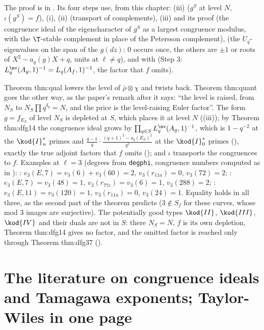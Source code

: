 The proof is in . Its four steps use, from this chapter: (iii) ($g^S$ at level $N$, $\iota(g^S)=f$),
(i), (ii) (transport of complements), (iii) and its proof (the congruence ideal of the eigencharacter of $g^S$ as a
largest congruence modulus, with the $\T$-stable complement in place of the Petersson complement),  (the $U_q$-eigenvalues on
the span of the $g(dz)$: $0$ occurs once, the others are $\pm1$ or roots of $X^2-a_q(g)X+q$, units at $\ell\ne q$), and  with
 (Step 3: $L_q^{\nv}(A_g,1)^{-1}=L_q(A_f,1)^{-1}$, the factor that $f$ omits).

\begin{remark}\label{rem:modgalrep:quant-level-raising}
Theorem thm:qual lowers the level of $\bar\rho\otimes\chi$ and twists back. Theorem thm:quant goes the other way, as the paper's remark after it says: ``the level is
raised, from $N_S$ to $N_S\prod q^{\delta_q}=N$, and the price is the level-raising Euler factor''. The form $g=f_{E_S}$ of level $N_S$ is depleted at $S$, which places it at
level $N$ ((iii)); by Theorem thm:dfg14 the congruence ideal grows by $\prod_{q\in S}L_q^{\nv}(A_g,1)^{-1}$, which is $1-q^{-2}$ at the $\kod{I}_n^*$
primes and $\frac{q-1}q\cdot\frac{(q+1)^2-a_q(E_S)^2}{q^2}$ at the $\kod{I}_0^*$ primes (), exactly the true adjoint factors that $f$ omits
(); and $\iota$ transports the congruences to $f$. Examples at $\ell=3$ (degrees from \texttt{degphi}, congruence numbers computed as in
): : $e_3(E,7)=v_3(6)+v_3(60)=2$, $v_3(r_{11a})=0$, $v_3(72)=2$; : $e_3(E,7)=v_3(48)=1$, $v_3(r_{77c})=v_3(6)=1$, $v_3(288)=2$; :
$e_3(E,11)=v_3(120)=1$, $v_3(r_{11a})=0$, $v_3(24)=1$. Equality holds in all three, as the second part of the theorem predicts ($3\notin S_f$ for these curves, whose mod $3$
images are surjective). The potentially good types $\kod{II}$, $\kod{III}$, $\kod{IV}$ and their duals are not in $S$: there $N_S=N$, $f$ is its own depletion, Theorem thm:dfg14 gives no
factor, and the omitted factor is reached only through Theorem thm:dfg37 ().
\end{remark}

\section[Congruence ideals in the literature]{The literature on congruence ideals and Tamagawa exponents; Taylor-Wiles in one page}\label{sec:modgalrep:literature}

